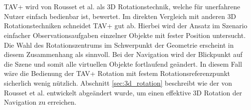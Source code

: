 \\\\
TAV+ wird von Rousset et al. als 3D Rotationstechnik, welche für unerfahrene Nutzer einfach bedienbar ist, bewertet. Im direkten Vergleich mit anderen 3D Rotationstechniken schneidet TAV+ gut ab. Hierbei wird der Ansatz im Szenario einfacher Observationsaufgaben einzelner Objekte mit fester Position untersucht. Die Wahl des Rotationszentrums im Schwerpunkt der Geometrie erscheint in diesem Zusammenhang als sinnvoll. Bei der Navigation wird der Blickpunkt auf die Szene und somit alle virtuellen Objekte fortlaufend geändert. In diesem Fall wäre die Bedienung der TAV+ Rotation mit festem Rotationsreferenzpunkt sicherlich wenig nützlich. Abschnitt \ref{sec:3d_rotation} beschreibt wie der von Rousset et al. entwickelt abgeändert wurde, um einen effektive 3D Rotation der Navigation zu erreichen.
